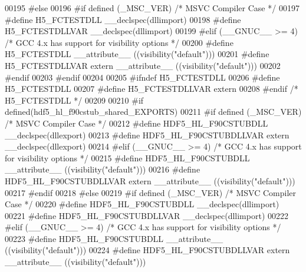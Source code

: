 \begin{DoxyCode}
00195 \textcolor{preprocessor}{#else}
00196 \textcolor{preprocessor}{  #if defined (\_MSC\_VER)  }\textcolor{comment}{/* MSVC Compiler Case */}\textcolor{preprocessor}{}
00197 \textcolor{preprocessor}{    #define H5\_FCTESTDLL \_\_declspec(dllimport)}
00198 \textcolor{preprocessor}{    #define H5\_FCTESTDLLVAR \_\_declspec(dllimport)}
00199 \textcolor{preprocessor}{  #elif (\_\_GNUC\_\_ >= 4)  }\textcolor{comment}{/* GCC 4.x has support for visibility options */}\textcolor{preprocessor}{}
00200 \textcolor{preprocessor}{    #define H5\_FCTESTDLL \_\_attribute\_\_ ((visibility("default")))}
00201 \textcolor{preprocessor}{    #define H5\_FCTESTDLLVAR extern \_\_attribute\_\_ ((visibility("default")))}
00202 \textcolor{preprocessor}{  #endif}
00203 \textcolor{preprocessor}{#endif}
00204 
00205 \textcolor{preprocessor}{#ifndef H5\_FCTESTDLL}
00206 \textcolor{preprocessor}{  #define H5\_FCTESTDLL}
00207 \textcolor{preprocessor}{  #define H5\_FCTESTDLLVAR extern}
00208 \textcolor{preprocessor}{#endif }\textcolor{comment}{/* H5\_FCTESTDLL */}\textcolor{preprocessor}{}
00209 
00210 \textcolor{preprocessor}{#if defined(hdf5\_hl\_f90cstub\_shared\_EXPORTS)}
00211 \textcolor{preprocessor}{  #if defined (\_MSC\_VER)  }\textcolor{comment}{/* MSVC Compiler Case */}\textcolor{preprocessor}{}
00212 \textcolor{preprocessor}{    #define HDF5\_HL\_F90CSTUBDLL \_\_declspec(dllexport)}
00213 \textcolor{preprocessor}{    #define HDF5\_HL\_F90CSTUBDLLVAR extern \_\_declspec(dllexport)}
00214 \textcolor{preprocessor}{  #elif (\_\_GNUC\_\_ >= 4)  }\textcolor{comment}{/* GCC 4.x has support for visibility options */}\textcolor{preprocessor}{}
00215 \textcolor{preprocessor}{    #define HDF5\_HL\_F90CSTUBDLL \_\_attribute\_\_ ((visibility("default")))}
00216 \textcolor{preprocessor}{    #define HDF5\_HL\_F90CSTUBDLLVAR extern \_\_attribute\_\_ ((visibility("default")))}
00217 \textcolor{preprocessor}{  #endif}
00218 \textcolor{preprocessor}{#else}
00219 \textcolor{preprocessor}{  #if defined (\_MSC\_VER)  }\textcolor{comment}{/* MSVC Compiler Case */}\textcolor{preprocessor}{}
00220 \textcolor{preprocessor}{    #define HDF5\_HL\_F90CSTUBDLL \_\_declspec(dllimport)}
00221 \textcolor{preprocessor}{    #define HDF5\_HL\_F90CSTUBDLLVAR \_\_declspec(dllimport)}
00222 \textcolor{preprocessor}{  #elif (\_\_GNUC\_\_ >= 4)  }\textcolor{comment}{/* GCC 4.x has support for visibility options */}\textcolor{preprocessor}{}
00223 \textcolor{preprocessor}{    #define HDF5\_HL\_F90CSTUBDLL \_\_attribute\_\_ ((visibility("default")))}
00224 \textcolor{preprocessor}{    #define HDF5\_HL\_F90CSTUBDLLVAR extern \_\_attribute\_\_ ((visibility("default")))}

\end{DoxyCode}
